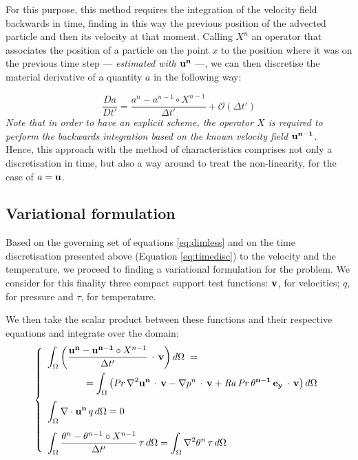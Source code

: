 \documentclass[12pt,oneside]{article}
\newcommand{\divergence}[1]{\nabla\cdot{#1}} 							%
\newcommand{\gradient}[1]{\nabla{#1}} 									%
\newcommand{\laplacian}[1]{\nabla^2{#1}} 								%
\newcommand\Pra{\mbox{\textit{Pr}}} 									%
\newcommand\Ray{\mbox{\textit{Ra}}}  									%
\newcommand\intO{\displaystyle\int_\Omega}								%
\begin{document}
For this purpose, this method requires the integration of the velocity field backwards in time, finding in this way the previous position of the advected particle and then its velocity at that moment. Calling $X^n$ an operator that associates the position of a particle on the point $x$ to the position where it was on the previous time step --- \emph{estimated with $\bf{u}^n$} ---, we can then discretise the material derivative of a quantity $a$ in the following way:

\begin{equation}\label{eq:timedisc}
\frac{Da}{Dt'} = \frac{a^{n} - a^{n-1} \circ X^{n-1} }{\Delta t'} + \mathcal{O}(\Delta t')
\end{equation}
\emph{\small{Note that in order to have an explicit scheme, the operator $X$ is required to perform the backwards integration based on the known velocity field $\bf{u}^{n-1}$.}}
\\

Hence, this approach with the method of characteristics comprises not only a discretisation in time, but also a way around to treat the non-linearity, for the case of $a = \bf{u}$.

\subsection{Variational formulation}

Based on the governing set of equations \ref{eq:dimless} and on the time discretisation presented above (Equation \ref{eq:timedisc}) to the velocity and the temperature, we proceed to finding a variational formulation for the problem. We consider for this finality three compact support test functions: $\bf{v}$, for velocities; $q$, for pressure and $\tau$, for temperature.

We then take the scalar product between these functions and their respective equations and integrate over the domain:
\begin{equation}\nonumber\left\{
\begin{array}{l}
\intO \left( \displaystyle\frac{{\bf{u}^{n}} - {\bf{u}^{n-1}} \circ X^{n-1} }{\Delta t'} \, \cdot \, \bf{v} \right) d\Omega \; = \\[10pt]
\qquad \qquad = \intO \left( \Pra \, \laplacian{\bf{u}^n} \, \cdot \, {\bf{v}} - \gradient{p^n} \, \cdot \, \bf{v} + \Ray \, \Pra \, \theta^{n-1} \, \bf{e_y} \, \cdot \, \bf{v} \right) d\Omega \\[12pt]
\intO \divergence{\bf{u}^n} \, q \, d\Omega = 0 \\[14pt]
\intO \displaystyle\frac{\theta^{n} - \theta^{n-1} \circ X^{n-1} }{\Delta t'} \, \tau \, d\Omega   = \intO \laplacian{\theta^n} \, \tau \, d\Omega
\end{array}\right.
\end{equation}
\end{document}
